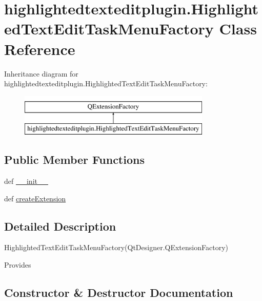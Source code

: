 \hypertarget{classhighlightedtexteditplugin_1_1HighlightedTextEditTaskMenuFactory}{}\section{highlightedtexteditplugin.\+Highlighted\+Text\+Edit\+Task\+Menu\+Factory Class Reference}
\label{classhighlightedtexteditplugin_1_1HighlightedTextEditTaskMenuFactory}
Inheritance diagram for highlightedtexteditplugin.\+Highlighted\+Text\+Edit\+Task\+Menu\+Factory\+:\begin{figure}[H]
\begin{center}
\leavevmode
\includegraphics[height=2.000000cm]{classhighlightedtexteditplugin_1_1HighlightedTextEditTaskMenuFactory}
\end{center}
\end{figure}
\subsection*{Public Member Functions}
\begin{DoxyCompactItemize}
\item 
def \hyperlink{classhighlightedtexteditplugin_1_1HighlightedTextEditTaskMenuFactory_a68a5dafcace7a32217bab8a376b8d963}{\+\_\+\+\_\+init\+\_\+\+\_\+}
\item 
def \hyperlink{classhighlightedtexteditplugin_1_1HighlightedTextEditTaskMenuFactory_a0176b5289ed7afd5f8f2ca2a50c54e4a}{create\+Extension}
\end{DoxyCompactItemize}


\subsection{Detailed Description}
\begin{DoxyVerb}HighlightedTextEditTaskMenuFactory(QtDesigner.QExtensionFactory)

Provides 
\end{DoxyVerb}
 

\subsection{Constructor \& Destructor Documentation}
\hypertarget{classhighlightedtexteditplugin_1_1HighlightedTextEditTaskMenuFactory_a68a5dafcace7a32217bab8a376b8d963}{}
